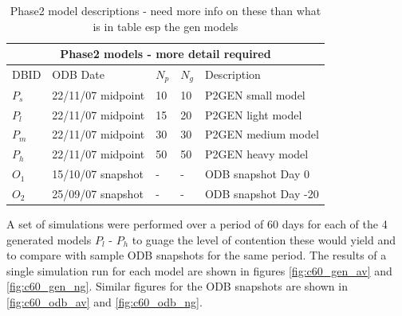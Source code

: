 \begin{table}[h]
 \begin{center}
  \begin{tabular}{lllll}
   \toprule
   \multicolumn{5}{c}{Phase2 models - more detail required} \\
   \midrule
   DBID & ODB Date & $N_p$ & $N_g$ & Description\\
   \midrule
   $P_s$ & 22/11/07 midpoint & 10 & 10 & P2GEN small model \\
   $P_l$ & 22/11/07 midpoint & 15 & 20 & P2GEN light model \\
   $P_m$ & 22/11/07 midpoint & 30 & 30 & P2GEN medium model\\
   $P_h$ & 22/11/07 midpoint & 50 & 50 & P2GEN heavy model \\
   \midrule
   $O_1$ & 15/10/07 snapshot & - & - & ODB snapshot Day 0\\
   $O_2$ & 25/09/07 snapshot & - & - & ODB snapshot Day -20\\
   \bottomrule
  \end{tabular}
 \end{center}
\caption{Phase2 model descriptions - need more info on these than what is in table esp the gen models}
\label{tab:ltc_p2models}
\end{table}


A set of simulations were performed over a period of 60 days for each of the 4 generated models $P_l$ - $P_h$ to guage the level of contention these would yield and to compare with sample ODB snapshots for the same period. The results of a single simulation run for each model are shown in figures \ref{fig:c60_gen_av} and \ref{fig:c60_gen_ng}. Similar figures for the ODB snapshots are shown in \ref{fig:c60_odb_av} and \ref{fig:c60_odb_ng}.


